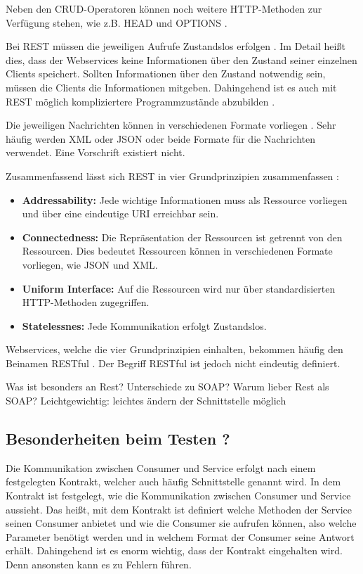 \documentclass{llncs}
\begin{document}
Neben den CRUD-Operatoren können noch weitere HTTP-Methoden zur Verfügung stehen, wie z.B. HEAD und OPTIONS \cite{porres2011modeling}.

Bei REST müssen die jeweiligen Aufrufe Zustandslos erfolgen \cite{reza2010framework, porres2011modeling, kao2013performance}. Im Detail heißt dies, dass der Webservices keine Informationen über den Zustand seiner einzelnen Clients speichert. Sollten Informationen über den Zustand notwendig sein, müssen die Clients die Informationen mitgeben. Dahingehend ist es auch mit REST möglich kompliziertere Programmzustände abzubilden \cite{porres2011modeling}.

Die jeweiligen Nachrichten können in verschiedenen Formate vorliegen
\cite{reza2010framework}. Sehr häufig werden XML oder JSON oder beide Formate für die Nachrichten verwendet. 
Eine Vorschrift existiert nicht.

Zusammenfassend lässt sich REST in vier Grundprinzipien zusammenfassen \citep{porres2011modeling}: 

\begin{itemize}
\item \textbf{Addressability: } Jede wichtige Informationen muss als Ressource vorliegen und über eine eindeutige URI erreichbar sein.
\item \textbf{Connectedness: } Die Repräsentation der Ressourcen ist getrennt von den Ressourcen. Dies bedeutet Ressourcen können in verschiedenen Formate vorliegen, wie JSON und XML.
\item \textbf{Uniform Interface: } Auf die Ressourcen wird nur über standardisierten HTTP-Methoden zugegriffen.
\item \textbf{Statelessnes: } Jede Kommunikation erfolgt Zustandslos.
\end{itemize}

Webservices, welche die vier Grundprinzipien einhalten, bekommen häufig den Beinamen RESTful \citep{porres2011modeling}. Der Begriff RESTful ist jedoch nicht eindeutig definiert.  

Was ist besonders an Rest? Unterschiede zu SOAP? Warum lieber Rest als SOAP?
Leichtgewichtig: leichtes ändern der Schnittstelle möglich

\subsection{Besonderheiten beim Testen ?}
Die Kommunikation zwischen Consumer und Service erfolgt nach einem festgelegten Kontrakt, welcher auch häufig Schnittstelle genannt wird. In dem Kontrakt ist festgelegt, wie die Kommunikation zwischen Consumer und Service aussieht. Das heißt, mit dem Kontrakt ist definiert welche Methoden der Service seinen Consumer anbietet und wie die Consumer sie aufrufen können, also welche Parameter benötigt werden und in welchem Format der Consumer seine Antwort erhält. Dahingehend ist es enorm wichtig, dass der Kontrakt eingehalten wird. Denn ansonsten kann es zu Fehlern führen.
\end{document}
